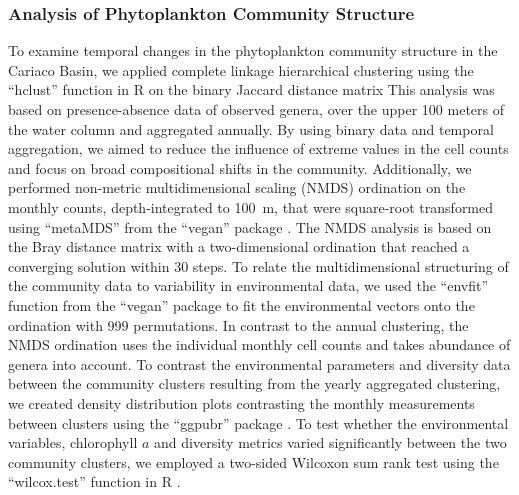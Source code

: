 \documentclass[draft]{agujournal2019}
\begin{document}
    \subsubsection{Analysis of Phytoplankton Community Structure}
    To examine temporal changes in the phytoplankton community structure in the Cariaco Basin, we applied complete linkage hierarchical clustering using the ``hclust'' function in R \cite{r_core_team_r_2024} on the binary Jaccard distance matrix This analysis was based on presence-absence data of observed genera, over the upper 100 meters of the water column and aggregated annually. By using binary data and temporal aggregation, we aimed to reduce the influence of extreme values in the cell counts and focus on broad compositional shifts in the community. 
    Additionally, we performed non-metric multidimensional scaling (NMDS) ordination on the monthly counts, depth-integrated to \qty{100}{\meter}, that were square-root transformed using ``metaMDS'' from the ``vegan'' package \cite{oksanen_vegan_2024}. The NMDS analysis is based on the Bray distance matrix with a two-dimensional ordination that reached a converging solution within 30 steps. To relate the multidimensional structuring of the community data to variability in environmental data, we used the ``envfit'' function from the ``vegan'' package to fit the environmental vectors onto the ordination with 999 permutations. In contrast to the annual clustering, the NMDS ordination uses the individual monthly cell counts and takes abundance of genera into account.
    To contrast the environmental parameters and diversity data between the community clusters resulting from the yearly aggregated clustering, we created density distribution plots contrasting the monthly measurements between clusters using the ``ggpubr'' package \cite{kassambara_ggpubr_2023}. To test whether the environmental variables, chlorophyll $a$ and diversity metrics varied significantly between the two community clusters, we employed a two-sided Wilcoxon sum rank test using the ``wilcox.test'' function in R \cite{r_core_team_r_2024}.

    
\end{document}
